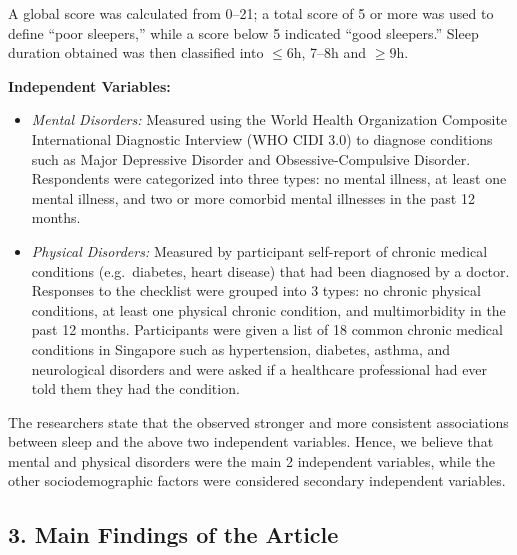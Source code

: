 A global score was calculated from 0--21; a total score of 5 or more was used to define ``poor sleepers,'' while a score below 5 indicated ``good sleepers.'' Sleep duration obtained was then classified into $\leq 6$h, 7--8h and $\geq 9$h.

\noindent\textbf{Independent Variables:}
\begin{itemize}
    \item \textit{Mental Disorders:} Measured using the World Health Organization Composite International Diagnostic Interview (WHO CIDI 3.0) to diagnose conditions such as Major Depressive Disorder and Obsessive-Compulsive Disorder. Respondents were categorized into three types: no mental illness, at least one mental illness, and two or more comorbid mental illnesses in the past 12 months.

    \item \textit{Physical Disorders:} Measured by participant self-report of chronic medical conditions (e.g.\ diabetes, heart disease) that had been diagnosed by a doctor. Responses to the checklist were grouped into 3 types: no chronic physical conditions, at least one physical chronic condition, and multimorbidity in the past 12 months. Participants were given a list of 18 common chronic medical conditions in Singapore such as hypertension, diabetes, asthma, and neurological disorders and were asked if a healthcare professional had ever told them they had the condition.
\end{itemize}

The researchers state that the observed stronger and more consistent associations between sleep and the above two independent variables. Hence, we believe that mental and physical disorders were the main 2 independent variables, while the other sociodemographic factors were considered secondary independent variables.

\subsection*{3. Main Findings of the Article}

